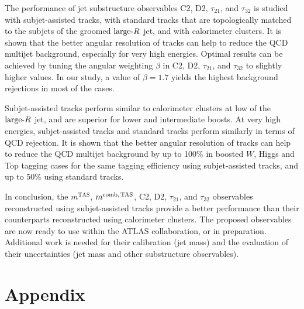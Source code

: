 \documentclass[UKenglish,texlive=2013]{\ATLASLATEXPATH atlasdoc}
\newcommand{\mtas}{\ensuremath{m^\textrm{TAS}}\xspace}
\newcommand{\mcombtas}{\ensuremath{m^\textrm{comb,\,TAS}}\xspace}
\newcommand{\larger}{\ensuremath{\textrm{large}\hbox{-}R}\xspace}
\begin{document}
The performance of jet substructure observables C2, D2, $\tau_{21}$, and $\tau_{32}$ is studied with subjet-assisted tracks, with standard tracks that are topologically matched to the subjets of the groomed \larger jet, and with calorimeter clusters. It is shown that the better angular resolution of tracks can help to reduce the QCD multijet background, especially for very high energies. Optimal results can be achieved by tuning the angular weighting $\beta$ in  C2, D2, $\tau_{21}$, and $\tau_{32}$ to slightly higher values. In our study, a value of $\beta=1.7$ yields the highest background rejections in most of the cases.  


Subjet-assisted tracks perform similar to calorimeter clusters at low \pt of the \larger jet, and are superior for lower and intermediate boosts. At very high energies, subjet-assisted tracks and standard tracks perform similarly in terms of QCD rejection. It is shown that the better angular resolution of tracks can help to reduce the QCD multijet background by up to 100\% in boosted $W$, Higgs and Top tagging cases for the same tagging efficiency using subjet-assisted tracks, and up to 50\% using standard tracks.



In conclusion, the $\mtas$, $\mcombtas$, C2, D2, $\tau_{21}$, and $\tau_{32}$ observables reconstructed using subjet-assisted tracks provide a better performance than their counterparts reconstructed using calorimeter clusters. The proposed observables are now ready to use within the ATLAS collaboration, or in preparation. Additional work is needed for their calibration (jet mass) and the evaluation of their uncertainties (jet mass and other substructure observables).

\clearpage
\appendix
\part*{Appendix}





\end{document}
